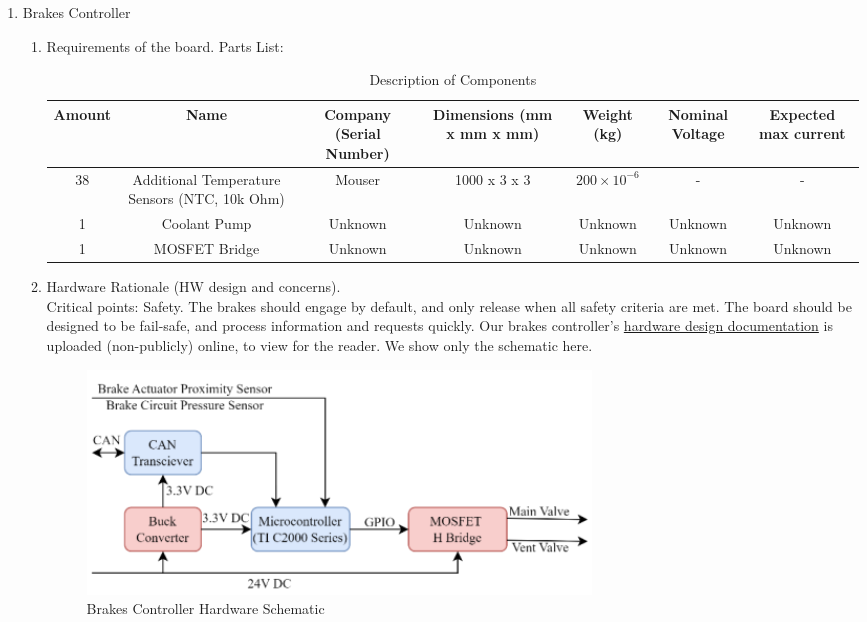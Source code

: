 \begin{enumerate}
    \item Brakes Controller
    \begin{enumerate}
        \item Requirements of the board.
        Parts List:
            \begin{table}[h]
                \centering
                \begin{adjustbox}{width=\textwidth,center}
                    \begin{tabular}{|c|c|c|c|c|c|c|}
                    \hline
                    \textbf{Amount} & \textbf{Name} & \textbf{Company (Serial Number)} & \textbf{Dimensions (mm x mm x mm)} & \textbf{Weight (kg)} & \textbf{Nominal Voltage} & \textbf{Expected max current} \\
                    \hline
                    38 & Additional Temperature Sensors (NTC, 10k Ohm) & Mouser & 1000 x 3 x 3 & $200 \times 10^{-6}$ & - & - \\
                    \hline
                    1 & Coolant Pump & Unknown & Unknown & Unknown & Unknown & Unknown \\
                    \hline
                    1 & MOSFET Bridge & Unknown & Unknown & Unknown & Unknown & Unknown \\
                    \hline
                    \end{tabular}
                \end{adjustbox}
                \caption{Description of Components}
                \label{tab:components}
            \end{table}
        \item Hardware Rationale (HW design and concerns). \\
        Critical points: Safety. The brakes should engage by default, and only release when all safety criteria are met. The board should be designed to be fail-safe, and process information and requests quickly.
        Our brakes controller's \href{https://drive.google.com/file/d/1a7zaJbmfFdLdrrGtLt2_ySVTqbc168NL/}{hardware design documentation} is uploaded (non-publicly) online, to view for the reader. We show only the schematic here. 
        \begin{figure}
            \centering
            \includegraphics[width=\linewidth]{texfiles/elec/eimg/Brakes_architecture}
            \caption{Brakes Controller Hardware Schematic}
            \label{fig:Brakes Controller Hardware Schematic}
        \end{figure}



\end{enumerate}
\end{enumerate}
